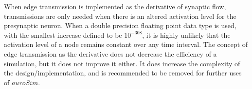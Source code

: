 	When edge transmission is implemented as the derivative of synaptic flow, transmissions are only needed when there is an altered activation level for the presynaptic neuron.
	When a double precision floating point data type is used, with the smallest increase defined to be $10^{-308}$, it is highly unlikely that the activation level of a node remains constant over any time interval.
	The concept of edge transmission as the derivative does not decrease the efficiency of a simulation, but it does not improve it either.
	It does increase the complexity of the design/implementation, and is recommended to be removed for further uses of $auroSim$.
	


	


